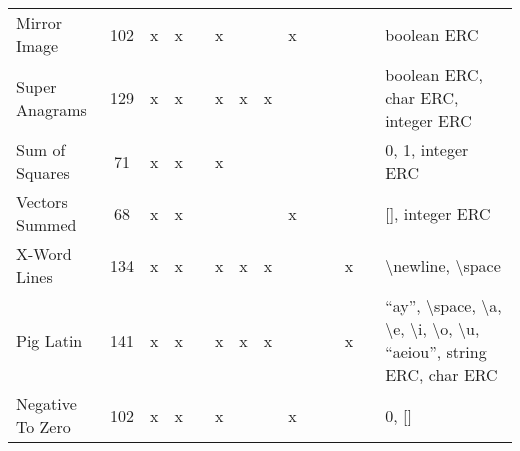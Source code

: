 \documentclass{sig-alternate}
\begin{document}
\begin{table*}
\begin{tabular}{>{\raggedright}p{3.1cm}cccccccccccc>{\raggedright}p{5.5cm}}
Mirror Image               & 102             & x    & x       &       & x       &      &        & x                  &                  &                   &       &            & boolean ERC                                                                                                                                                                                                                 \tabularnewline
Super Anagrams             & 129             & x    & x       &       & x       & x    & x      &                    &                  &                   &       &            & boolean ERC, char ERC, integer ERC                                                                                                                                                                                          \tabularnewline
Sum of Squares             & 71              & x    & x       &       & x       &      &        &                    &                  &                   &       &            & 0, 1, integer ERC                                                                                                                                                                                                           \tabularnewline
Vectors Summed             & 68              & x    & x       &       &         &      &        & x                  &                  &                   &       &            & {[}{]}, integer ERC                                                                                                                                                                                                         \tabularnewline
X-Word Lines               & 134             & x    & x       &       & x       & x    & x      &                    &                  &                   & x     &            & \textbackslash newline, \textbackslash space                                                                                                                                                                                \tabularnewline
Pig Latin                  & 141             & x    & x       &       & x       & x    & x      &                    &                  &                   & x     &            & ``ay'', \textbackslash space, \textbackslash a, \textbackslash e, \textbackslash i, \textbackslash o, \textbackslash u, ``aeiou'', string ERC, char ERC                                                                         \tabularnewline
Negative To Zero           & 102             & x    & x       &       & x       &      &        & x                  &                  &                   &       &            & 0, {[}{]}                                                                                                                                                                                                                   \tabularnewline

\end{tabular}
\end{table*}
\end{document}
